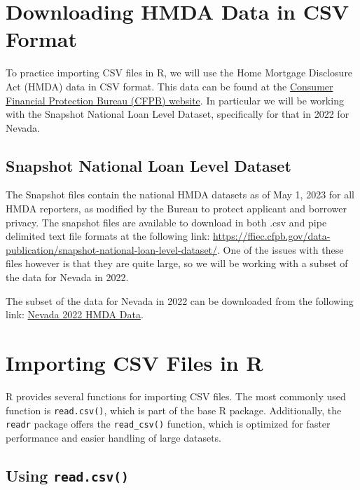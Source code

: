 \documentclass[
]{book}
\begin{document}
\section{Downloading HMDA Data in CSV Format}\label{downloading-hmda-data-in-csv-format}

To practice importing CSV files in R, we will use the Home Mortgage Disclosure Act (HMDA) data in CSV format. This data can be found at the \href{https://ffiec.cfpb.gov/}{Consumer Financial Protection Bureau (CFPB) website}. In particular we will be working with the Snapshot National Loan Level Dataset, specifically for that in 2022 for Nevada.

\subsection{Snapshot National Loan Level Dataset}\label{snapshot-national-loan-level-dataset}

The Snapshot files contain the national HMDA datasets as of May 1, 2023 for all HMDA reporters, as modified by the Bureau to protect applicant and borrower privacy. The snapshot files are available to download in both .csv and pipe delimited text file formats at the following link: \url{https://ffiec.cfpb.gov/data-publication/snapshot-national-loan-level-dataset/}. One of the issues with these files however is that they are quite large, so we will be working with a subset of the data for Nevada in 2022.

The subset of the data for Nevada in 2022 can be downloaded from the following link: \href{https://ffiec.cfpb.gov/v2/data-browser-api/view/csv?states=NV&years=2022}{Nevada 2022 HMDA Data}.

\section{Importing CSV Files in R}\label{importing-csv-files-in-r}

R provides several functions for importing CSV files. The most commonly used function is \texttt{read.csv()}, which is part of the base R package. Additionally, the \texttt{readr} package offers the \texttt{read\_csv()} function, which is optimized for faster performance and easier handling of large datasets.

\subsection{\texorpdfstring{Using \texttt{read.csv()}}{Using read.csv()}}\label{using-read.csv}
\end{document}
